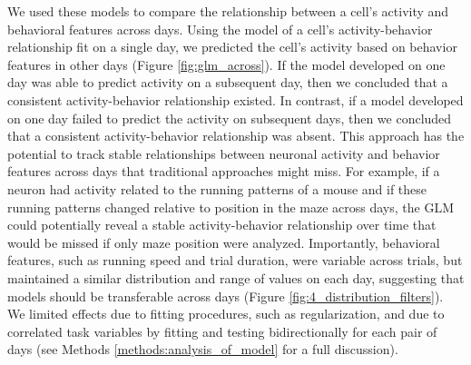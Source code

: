 We used these models to compare the relationship between a cell's activity and behavioral features across days. Using the model of a cell's activity-behavior relationship fit on a single day, we predicted the cell's activity based on behavior features in other days (Figure \ref{fig:glm_across}). If the model developed on one day was able to predict activity on a subsequent day, then we concluded that a consistent activity-behavior relationship existed. In contrast, if a model developed on one day failed to predict the activity on subsequent days, then we concluded that a consistent activity-behavior relationship was absent. This approach has the potential to track stable relationships between neuronal activity and behavior features across days that traditional approaches might miss. For example, if a neuron had activity related to the running patterns of a mouse and if these running patterns changed relative to position in the maze across days, the GLM could potentially reveal a stable activity-behavior relationship over time that would be missed if only maze position were analyzed. Importantly, behavioral features, such as running speed and trial duration, were variable across trials, but maintained a similar distribution and range of values on each day, suggesting that models should be transferable across days (Figure \ref{fig:4_distribution_filters}). We limited effects due to fitting procedures, such as regularization, and due to correlated task variables by fitting and testing bidirectionally for each pair of days (see Methods \ref{methods:analysis_of_model} for a full discussion). 

